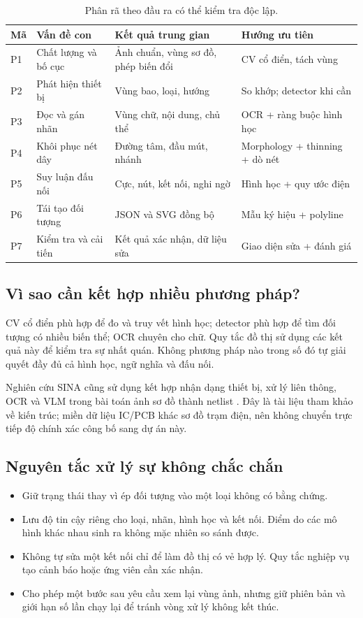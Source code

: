 \documentclass[11pt,a4paper]{article}
\newcommand{\code}[1]{\texttt{\detokenize{#1}}}
\begin{document}
\begin{table}[H]
\centering\small
\begin{tabularx}{\linewidth}{@{}p{8mm}p{34mm}Y Y@{}}
\toprule
\textbf{Mã} & \textbf{Vấn đề con} & \textbf{Kết quả trung gian} & \textbf{Hướng ưu tiên}\\\midrule
P1 & Chất lượng và bố cục & Ảnh chuẩn, vùng sơ đồ, phép biến đổi & CV cổ điển, tách vùng\\
P2 & Phát hiện thiết bị & Vùng bao, loại, hướng & So khớp; detector khi cần\\
P3 & Đọc và gán nhãn & Vùng chữ, nội dung, chủ thể & OCR + ràng buộc hình học\\
P4 & Khôi phục nét dây & Đường tâm, đầu mút, nhánh & Morphology + thinning + dò nét\\
P5 & Suy luận đấu nối & Cực, nút, kết nối, nghi ngờ & Hình học + quy ước điện\\
P6 & Tái tạo đối tượng & JSON và SVG đồng bộ & Mẫu ký hiệu + polyline\\
P7 & Kiểm tra và cải tiến & Kết quả xác nhận, dữ liệu sửa & Giao diện sửa + đánh giá\\\bottomrule
\end{tabularx}
\caption{Phân rã theo đầu ra có thể kiểm tra độc lập.}
\end{table}

\subsection{Vì sao cần kết hợp nhiều phương pháp?}
CV cổ điển phù hợp để đo và truy vết hình học; detector phù hợp để tìm đối tượng có nhiều biến thể; OCR chuyên cho chữ. Quy tắc đồ thị sử dụng các kết quả này để kiểm tra sự nhất quán. Không phương pháp nào trong số đó tự giải quyết đầy đủ cả hình học, ngữ nghĩa và đấu nối.

Nghiên cứu SINA cũng sử dụng kết hợp nhận dạng thiết bị, xử lý liên thông, OCR và VLM trong bài toán ảnh sơ đồ thành netlist \cite{sina}. Đây là tài liệu tham khảo về kiến trúc; miền dữ liệu IC/PCB khác sơ đồ trạm điện, nên không chuyển trực tiếp độ chính xác công bố sang dự án này.

\subsection{Nguyên tắc xử lý sự không chắc chắn}
\begin{itemize}
\item Giữ trạng thái \code{unknown} thay vì ép đối tượng vào một loại không có bằng chứng.
\item Lưu độ tin cậy riêng cho loại, nhãn, hình học và kết nối. Điểm do các mô hình khác nhau sinh ra không mặc nhiên so sánh được.
\item Không tự sửa một kết nối chỉ để làm đồ thị có vẻ hợp lý. Quy tắc nghiệp vụ tạo cảnh báo hoặc ứng viên cần xác nhận.
\item Cho phép một bước sau yêu cầu xem lại vùng ảnh, nhưng giữ phiên bản và giới hạn số lần chạy lại để tránh vòng xử lý không kết thúc.
\end{itemize}
\end{document}
